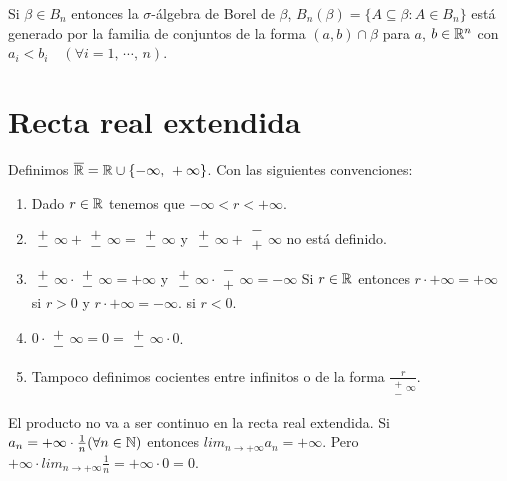 \begin{eg}
    Si \(\beta \in B_n\) entonces la \(\sigma\)-álgebra de Borel de \(\beta\), \(B_n(\beta) = \{ A \subseteq \beta : A \in B_n \}\) está generado por la familia de conjuntos
    de la forma \((a, b) \cap \beta\) para \(a\), \(b \in \mathbb{R}^n\) con \(a_i < b_i \quad (\forall i = 1 \text{, } \cdots \text{, } n)\).
\end{eg}

\section{Recta real extendida}

\begin{definition}
    Definimos \(\overline{\mathbb{R}} = \mathbb{R} \cup \{ -\infty\text{, } +\infty \}\). Con las siguientes convenciones:
    \begin{enumerate}
        \item Dado \(r \in \mathbb{R}\) tenemos que \(-\infty < r < +\infty\).
        \item \(\substack{+ \\ -} \infty + \substack{+ \\ -} \infty = \substack{+ \\ -} \infty\) y
              \(\substack{+ \\ -} \infty + \substack{- \\ +} \infty\) no está definido.
        \item \(\substack{+ \\ -} \infty \cdot \substack{+ \\ -} \infty = +\infty\) y
              \(\substack{+ \\ -} \infty \cdot \substack{- \\ +} \infty = -\infty\)
              Si \(r \in \mathbb{R}\) entonces \(r \cdot +\infty = +\infty\) si \(r > 0\) y \(r \cdot +\infty = -\infty\). si \(r < 0\).
        \item \(0 \cdot \substack{+ \\ -} \infty = 0 = \substack{+ \\ -} \infty \cdot 0\).
        \item Tampoco definimos cocientes entre infinitos o de la forma \(\frac{r}{\substack{+ \\ -} \infty}\).
    \end{enumerate}
\end{definition}

\begin{note}
    El producto no va a ser continuo en la recta real extendida.
    Si \(a_n = +\infty \cdot \frac{1}{n} (\forall n \in \mathbb{N})\) entonces \(lim_{n \to +\infty} a_n = +\infty\). Pero \(+\infty \cdot lim_{n \to +\infty} \frac{1}{n} = +\infty \cdot 0 = 0\).
\end{note}

